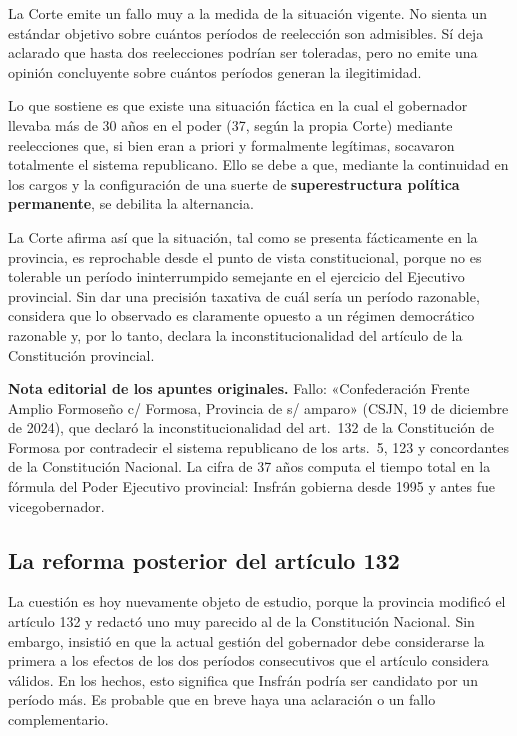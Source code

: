 \documentclass[12pt,oneside]{book}
\begin{document}
La Corte emite un fallo muy a la medida de la situación vigente. No sienta un estándar objetivo sobre cuántos períodos de reelección son admisibles. Sí deja aclarado que hasta dos reelecciones podrían ser toleradas, pero no emite una opinión concluyente sobre cuántos períodos generan la ilegitimidad.

Lo que sostiene es que existe una situación fáctica en la cual el gobernador llevaba más de 30 años en el poder (37, según la propia Corte) mediante reelecciones que, si bien eran a priori y formalmente legítimas, socavaron totalmente el sistema republicano. Ello se debe a que, mediante la continuidad en los cargos y la configuración de una suerte de \textbf{superestructura política permanente}, se debilita la alternancia.

La Corte afirma así que la situación, tal como se presenta fácticamente en la provincia, es reprochable desde el punto de vista constitucional, porque no es tolerable un período ininterrumpido semejante en el ejercicio del Ejecutivo provincial. Sin dar una precisión taxativa de cuál sería un período razonable, considera que lo observado es claramente opuesto a un régimen democrático razonable y, por lo tanto, declara la inconstitucionalidad del artículo de la Constitución provincial.

\begin{note}
\textbf{Nota editorial de los apuntes originales.} Fallo: «Confederación Frente Amplio Formoseño c/ Formosa, Provincia de s/ amparo» (CSJN, 19 de diciembre de 2024), que declaró la inconstitucionalidad del art.~132 de la Constitución de Formosa por contradecir el sistema republicano de los arts.~5, 123 y concordantes de la Constitución Nacional. La cifra de 37 años computa el tiempo total en la fórmula del Poder Ejecutivo provincial: Insfrán gobierna desde 1995 y antes fue vicegobernador.
\end{note}

\subsection{La reforma posterior del artículo 132}

La cuestión es hoy nuevamente objeto de estudio, porque la provincia modificó el artículo 132 y redactó uno muy parecido al de la Constitución Nacional. Sin embargo, insistió en que la actual gestión del gobernador debe considerarse la primera a los efectos de los dos períodos consecutivos que el artículo considera válidos. En los hechos, esto significa que Insfrán podría ser candidato por un período más. Es probable que en breve haya una aclaración o un fallo complementario.
\end{document}
